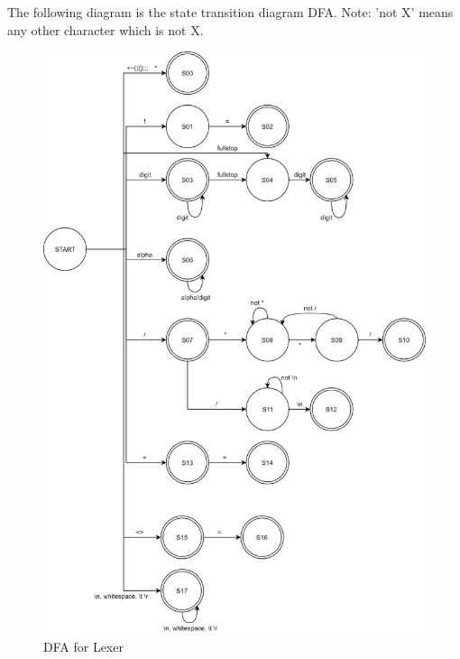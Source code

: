 The following diagram is the state transition diagram DFA. Note: 'not X' means any other character which is not X.
\begin{center}
\begin{figure}[H]
	\centering
	\includegraphics[scale=0.29]{Images/Q1_StateTransitionDiagram.png}
	\caption{DFA for Lexer}
\end{figure}
\end{center}

